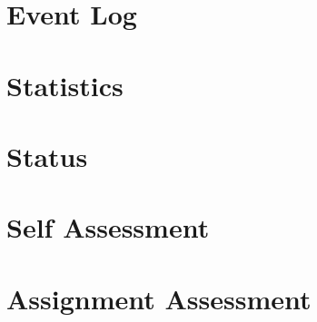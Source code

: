 \documentclass[12pt]{article}
\begin{document}

\tableofcontents

\section{Event Log}



\section{Statistics}



\section{Status}



\section{Self Assessment}



\section{Assignment Assessment}



\end{document}
